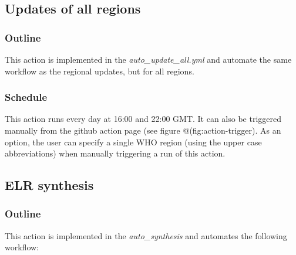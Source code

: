 \documentclass[]{book}
\begin{document}
\hypertarget{updates-of-all-regions}{%
\subsection{Updates of all regions}\label{updates-of-all-regions}}

\hypertarget{outline-1}{%
\subsubsection{Outline}\label{outline-1}}

This action is implemented in the \emph{auto\_update\_all.yml} and automate the same
workflow as the regional updates, but for all regions.

\hypertarget{schedule-1}{%
\subsubsection{Schedule}\label{schedule-1}}

This action runs every day at 16:00 and 22:00 GMT. It can also be triggered
manually from the github action page (see figure @(fig:action-trigger). As an
option, the user can specify a single WHO region (using the upper case
abbreviations) when manually triggering a run of this action.

\hypertarget{elr-synthesis}{%
\subsection{ELR synthesis}\label{elr-synthesis}}

\hypertarget{outline-2}{%
\subsubsection{Outline}\label{outline-2}}

This action is implemented in the \emph{auto\_synthesis} and automates the following
workflow:
\end{document}
